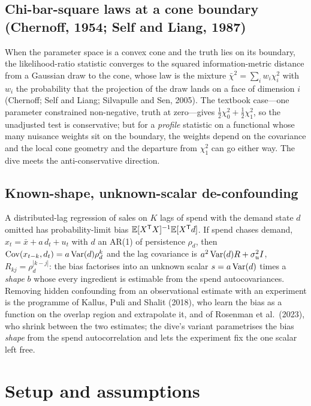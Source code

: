 \subsection{Chi-bar-square laws at a cone boundary (Chernoff, 1954; Self and Liang, 1987)}

When the parameter space is a convex cone and the truth lies on its boundary, the likelihood-ratio statistic converges to the squared information-metric distance from a Gaussian draw to the cone, whose law is the mixture $\bar\chi^2 = \sum_i w_i\chi^2_i$ with $w_i$ the probability that the projection of the draw lands on a face of dimension $i$ (Chernoff; Self and Liang; Silvapulle and Sen, 2005). The textbook case---one parameter constrained non-negative, truth at zero---gives $\tfrac12\chi^2_0 + \tfrac12\chi^2_1$, so the unadjusted test is conservative; but for a \emph{profile} statistic on a functional whose many nuisance weights sit on the boundary, the weights depend on the covariance and the local cone geometry and the departure from $\chi^2_1$ can go either way. The dive meets the anti-conservative direction.

\subsection{Known-shape, unknown-scalar de-confounding}

A distributed-lag regression of sales on $K$ lags of spend with the demand state $d$ omitted has probability-limit bias $\mathbb{E}[X^{\mathsf{T}} X]^{-1}\mathbb{E}[X^{\mathsf{T}} d]$. If spend chases demand, $x_t = \bar x + a\,d_t + u_t$ with $d$ an AR(1) of persistence $\rho_d$, then $\operatorname{Cov}(x_{t-k}, d_t) = a\operatorname{Var}(d)\rho_d^k$ and the lag covariance is $a^2\operatorname{Var}(d)R + \sigma_u^2 I$, $R_{kj} = \rho_d^{|k-j|}$: the bias factorises into an unknown scalar $s = a\operatorname{Var}(d)$ times a \emph{shape} $b$ whose every ingredient is estimable from the spend autocovariances. Removing hidden confounding from an observational estimate with an experiment is the programme of Kallus, Puli and Shalit (2018), who learn the bias as a function on the overlap region and extrapolate it, and of Rosenman et al.\ (2023), who shrink between the two estimates; the dive's variant parametrises the bias \emph{shape} from the spend autocorrelation and lets the experiment fix the one scalar left free.

\section{Setup and assumptions}

